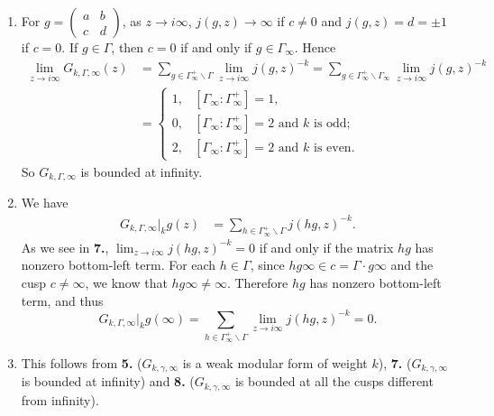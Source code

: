 \documentclass{article}
\theoremstyle{definition}
\theoremstyle{remark}
\newcommand{\under}{\backslash}
\begin{document}
\begin{enumerate}
\item For $g = \begin{pmatrix}
    a&b\\c&d
\end{pmatrix}$, as $z\to i\infty$, $j(g, z) \to \infty$ if $c\ne 0$ and $j(g, z) = d = \pm 1$ if $c = 0$.
If $g\in\Gamma$, then $c = 0$ if and only if $g\in\Gamma_\infty$.
Hence \begin{align*}
    \lim_{z\to i\infty}G_{k, \Gamma, \infty}(z)
    &= \sum_{g\in\Gamma_\infty^+\under\Gamma} \lim_{z\to i\infty} j(g, z)^{-k}
    = \sum_{g\in \Gamma_\infty^+\under\Gamma_\infty} \lim_{z\to i\infty}j(g, z)^{-k}
    \\ &= \begin{cases}
        1, & [\Gamma_\infty : \Gamma_\infty^+] = 1,\\
        0, & [\Gamma_\infty : \Gamma_\infty^+] = 2 \text{ and } k \text{ is odd};\\
        2, & [\Gamma_\infty : \Gamma_\infty^+] = 2 \text{ and } k \text{ is even}.
    \end{cases}
\end{align*}
So $G_{k, \Gamma, \infty}$ is bounded at infinity.

\item We have\begin{align*}
    G_{k, \Gamma, \infty}|_kg(z)
    &= \sum_{h\in\Gamma_\infty^+\under\Gamma} j(hg, z)^{-k}.
\end{align*}
As we see in \textbf{7.}, $\lim_{z\to i\infty}j(hg, z)^{-k} = 0$ if and only if the matrix $hg$ has nonzero bottom-left term.
For each $h\in\Gamma$, since $hg\infty\in c = \Gamma\cdot g\infty$ and the cusp $c\ne \infty$, we know that $hg\infty\ne\infty$. Therefore $hg$ has nonzero bottom-left term, and thus
\[G_{k, \Gamma, \infty}|_kg(\infty)
= \sum_{h\in\Gamma_\infty^+\under\Gamma}
\lim_{z\to i\infty} j(hg, z)^{-k} = 0.\]



\item This follows from \textbf{5.}\! ($G_{k, \gamma, \infty}$ is a weak modular form of weight $k$), \textbf{7.}\! ($G_{k, \gamma, \infty}$ is bounded at infinity) and \textbf{8.}\! ($G_{k, \gamma, \infty}$ is bounded at all the cusps different from infinity).


\end{enumerate}
\end{document}

